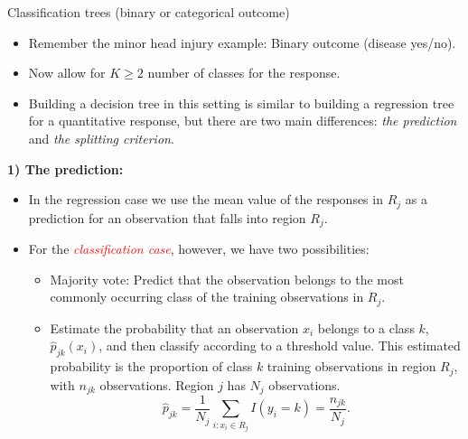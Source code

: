\documentclass[10pt,ignorenonframetext,]{beamer}
\providecommand{\tightlist}{%
  \setlength{\itemsep}{0pt}\setlength{\parskip}{0pt}}
\begin{document}
\begin{frame}{Classification trees (binary or categorical outcome)}

\vspace{2mm}

\begin{itemize}
\tightlist
\item
  Remember the minor head injury example: Binary outcome (disease
  yes/no).
\end{itemize}

\vspace{1mm}

\begin{itemize}
\tightlist
\item
  Now allow for \(K\geq 2\) number of classes for the response.
\end{itemize}

\vspace{1mm}

\begin{itemize}
\tightlist
\item
  Building a decision tree in this setting is similar to building a
  regression tree for a quantitative response, but there are two main
  differences: \emph{the prediction} and \emph{the splitting criterion}.
\end{itemize}

\end{frame}

\begin{frame}

\textbf{1) The prediction:}

\begin{itemize}
\item
  In the regression case we use the mean value of the responses in
  \(R_j\) as a prediction for an observation that falls into region
  \(R_j\).
\item
  For the \emph{\textcolor{red}{classification case}}, however, we have
  two possibilities:

  \begin{itemize}
  \tightlist
  \item
    Majority vote: Predict that the observation belongs to the most
    commonly occurring class of the training observations in \(R_j\).\\
  \item
    Estimate the probability that an observation \(x_i\) belongs to a
    class \(k\), \(\hat{p}_{jk}(x_i)\), and then classify according to a
    threshold value. This estimated probability is the proportion of
    class \(k\) training observations in region \(R_j\), with \(n_{jk}\)
    observations. Region \(j\) has \(N_j\) observations.
    \[\hat{p}_{jk} = \frac{1}{N_j} \sum_{i:x_i \in R_j} I(y_i = k)=\frac{n_{jk}}{N_j}.\]
  \end{itemize}
\end{itemize}

\end{frame}
\end{document}

